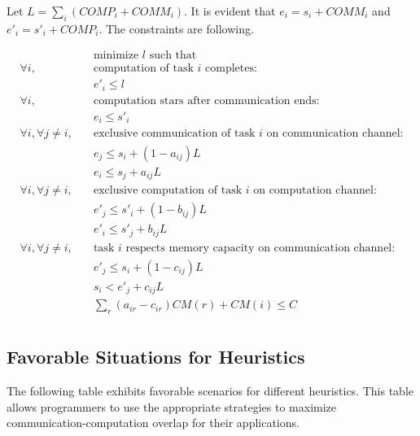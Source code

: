\documentclass[sigconf]{acmart}
\begin{document}



\noindent Let $L=\sum_i (COMP_i + COMM_i)$. It is evident that $e_i =s_i + COMM_i$ and $e'_i =s'_i + COMP_i$. The constraints are following.

\vspace*{-0.5cm}
\begin{align*}
& \text{minimize } l \text{ such that }\\
\forall i, \quad & \text{computation of task } i \text{ completes:}\\
& e'_i \leq l\\
\forall i, \quad & \text{computation stars after communication ends:}\\
& e_i \leq s'_i\\
\forall i, \forall j\ne i, \quad & \text{exclusive communication of task } i \text{ on communication channel:}\\
& e_j \leq s_i +(1-a_{ij})L\\
& e_i\leq s_j +a_{ij}L\\
\forall i, \forall j\ne i, \quad & \text{exclusive computation of task } i \text{ on computation channel:}\\
& e'_j \leq s'_i +(1-b_{ij})L\\
& e'_i\leq s'_j +b_{ij}L\\
\forall i, \forall j\ne i, \quad & \text{task } i \text{ respects memory capacity on communication channel:}\\
& e'_j \leq s_i +(1-c_{ij})L\\
& s_i< e'_j +c_{ij}L\\
& \sum_r (a_{ir} - c_{ir})CM(r) + CM(i) \le C\\
\end{align*} 

\subsection{Favorable Situations for Heuristics}
\noindent The following table exhibits favorable scenarios for different heuristics. This table allows programmers to use the appropriate strategies to maximize communication-computation overlap for their applications.
\end{document}
